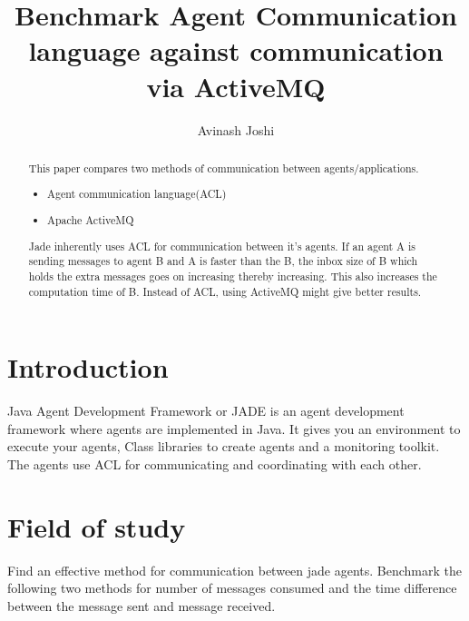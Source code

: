 \documentclass{article}
\title{Benchmark Agent Communication language against communication via ActiveMQ}
\author{Avinash Joshi}
\begin{document}

\maketitle
\begin{abstract}
This paper compares two methods of communication between agents/applications.
\begin{itemize}
\item Agent communication language(ACL)
\item Apache ActiveMQ
\end{itemize}
Jade inherently uses ACL for communication between it's agents. If an agent A is sending messages to agent B and A is faster than the B, the inbox size of B which holds the extra messages goes on increasing thereby increasing. This also increases the computation time of B. Instead of ACL, using ActiveMQ might give better results.
\end{abstract}

\section{Introduction}
Java Agent Development Framework or JADE is an agent development framework where agents are implemented in Java. It gives you an environment to execute your agents, Class libraries to create agents and a monitoring toolkit. The agents use ACL for communicating and coordinating with each other.

\section{Field of study}
Find an effective method for communication between jade agents. Benchmark the following two methods for number of messages consumed and the time difference between the message sent and message received.
\end{document}

